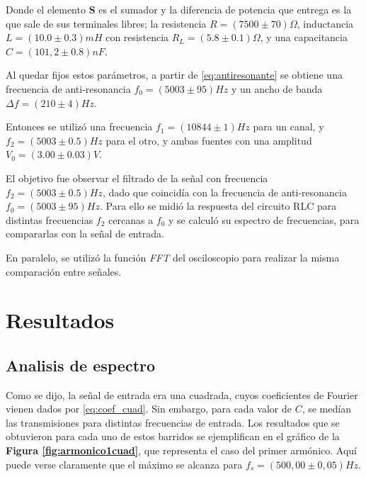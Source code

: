 \documentclass[11pt,a4paper]{article}
\begin{document}
Donde el elemento \textbf{S} es el sumador y la diferencia de potencia que entrega es la que sale de sus terminales libres; la resistencia $R=(7500 \pm 70)\Omega$, inductancia $L=(10.0 \pm 0.3)mH$ con resistencia $R_L =(5.8 \pm 0.1)\Omega$, y una capacitancia $C=(101,2 \pm 0.8)nF$.

Al quedar fijos estos parámetros, a partir de \eqref{eq:antiresonante} se obtiene una frecuencia de anti-resonancia $f_0 = (5003 \pm 95)Hz$ y un ancho de banda $\Delta f = (210 \pm 4)Hz$.

Entonces se utilizó una frecuencia $f_1=(10844 \pm 1)Hz$ para un canal, y $f_2=(5003\pm 0.5)Hz$ para el otro, y ambas fuentes con una amplitud $V_0=(3.00 \pm 0.03)V$.

El objetivo fue observar el filtrado de la señal con frecuencia $f_2=(5003\pm 0.5)Hz$, dado que coincidía con la frecuencia de anti-resonancia $f_0 = (5003 \pm 95)Hz$. Para ello se midió la respuesta del circuito RLC para distintas frecuencias $f_2$ cercanas a $f_0$ y se calculó su espectro de frecuencias, para compararlas con la señal de entrada.

En paralelo, se utilizó la función \textit{FFT} del osciloscopio para realizar la misma comparación entre señales.


\section{Resultados}
\label{sec:discusion}

\subsection{Analisis de espectro}
Como se dijo, la señal de entrada era una cuadrada, cuyos coeficientes de Fourier vienen dados por \eqref{eq:coef_cuad}. Sin embargo, para cada valor de $C$, se medían las transmisiones para distintas frecuencias de entrada. Los resultados que se obtuvieron para cada uno de estos barridos se ejemplifican en el gráfico de la \textbf{Figura \ref{fig:armonico1cuad}}, que representa el caso del primer armónico. Aquí puede verse claramente que el máximo se alcanza para $f_s = (500,00 \pm 0,05)Hz$.
\end{document}
